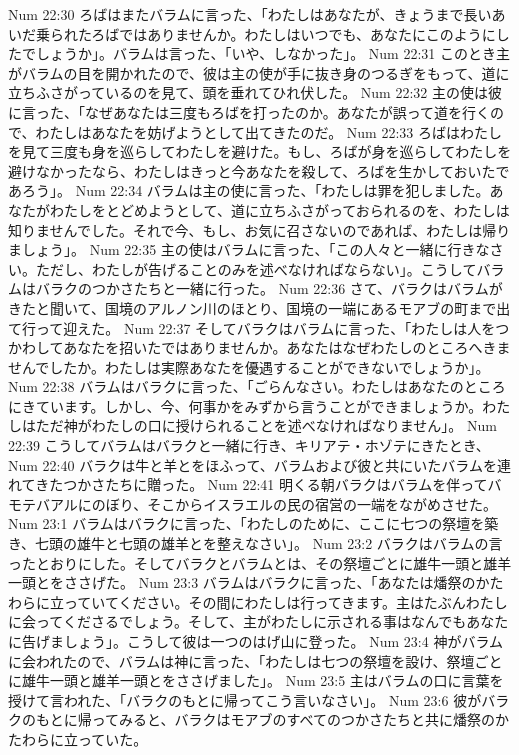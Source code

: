 Num 22:30  ろばはまたバラムに言った、「わたしはあなたが、きょうまで長いあいだ乗られたろばではありませんか。わたしはいつでも、あなたにこのようにしたでしょうか」。バラムは言った、「いや、しなかった」。
Num 22:31  このとき主がバラムの目を開かれたので、彼は主の使が手に抜き身のつるぎをもって、道に立ちふさがっているのを見て、頭を垂れてひれ伏した。
Num 22:32  主の使は彼に言った、「なぜあなたは三度もろばを打ったのか。あなたが誤って道を行くので、わたしはあなたを妨げようとして出てきたのだ。
Num 22:33  ろばはわたしを見て三度も身を巡らしてわたしを避けた。もし、ろばが身を巡らしてわたしを避けなかったなら、わたしはきっと今あなたを殺して、ろばを生かしておいたであろう」。
Num 22:34  バラムは主の使に言った、「わたしは罪を犯しました。あなたがわたしをとどめようとして、道に立ちふさがっておられるのを、わたしは知りませんでした。それで今、もし、お気に召さないのであれば、わたしは帰りましょう」。
Num 22:35  主の使はバラムに言った、「この人々と一緒に行きなさい。ただし、わたしが告げることのみを述べなければならない」。こうしてバラムはバラクのつかさたちと一緒に行った。
Num 22:36  さて、バラクはバラムがきたと聞いて、国境のアルノン川のほとり、国境の一端にあるモアブの町まで出て行って迎えた。
Num 22:37  そしてバラクはバラムに言った、「わたしは人をつかわしてあなたを招いたではありませんか。あなたはなぜわたしのところへきませんでしたか。わたしは実際あなたを優遇することができないでしょうか」。
Num 22:38  バラムはバラクに言った、「ごらんなさい。わたしはあなたのところにきています。しかし、今、何事かをみずから言うことができましょうか。わたしはただ神がわたしの口に授けられることを述べなければなりません」。
Num 22:39  こうしてバラムはバラクと一緒に行き、キリアテ・ホゾテにきたとき、
Num 22:40  バラクは牛と羊とをほふって、バラムおよび彼と共にいたバラムを連れてきたつかさたちに贈った。
Num 22:41  明くる朝バラクはバラムを伴ってバモテバアルにのぼり、そこからイスラエルの民の宿営の一端をながめさせた。
Num 23:1  バラムはバラクに言った、「わたしのために、ここに七つの祭壇を築き、七頭の雄牛と七頭の雄羊とを整えなさい」。
Num 23:2  バラクはバラムの言ったとおりにした。そしてバラクとバラムとは、その祭壇ごとに雄牛一頭と雄羊一頭とをささげた。
Num 23:3  バラムはバラクに言った、「あなたは燔祭のかたわらに立っていてください。その間にわたしは行ってきます。主はたぶんわたしに会ってくださるでしょう。そして、主がわたしに示される事はなんでもあなたに告げましょう」。こうして彼は一つのはげ山に登った。
Num 23:4  神がバラムに会われたので、バラムは神に言った、「わたしは七つの祭壇を設け、祭壇ごとに雄牛一頭と雄羊一頭とをささげました」。
Num 23:5  主はバラムの口に言葉を授けて言われた、「バラクのもとに帰ってこう言いなさい」。
Num 23:6  彼がバラクのもとに帰ってみると、バラクはモアブのすべてのつかさたちと共に燔祭のかたわらに立っていた。
